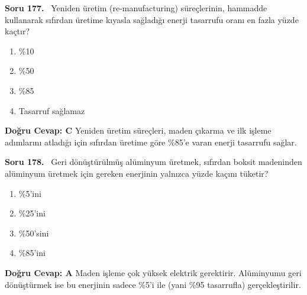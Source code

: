 \documentclass[11pt,a4paper,openany]{book}
\begin{document}
\needspace{5cm}
\vspace{8pt}
\noindent\textbf{\large\sffamily Soru 177.} \ Yeniden üretim (re-manufacturing) süreçlerinin, hammadde kullanarak sıfırdan üretime kıyasla sağladığı enerji tasarrufu oranı en fazla yüzde kaçtır?
\begin{enumerate}[label=\Alph*), leftmargin=25pt, topsep=4pt, itemsep=2pt]
    \item \%10
    \item \%50
    \item \%85
    \item Tasarruf sağlamaz
\end{enumerate}
\vspace{4pt}
\begin{tcolorbox}[title=Cevap ve Açıklama, colback=gray!3!white, colframe=primarycolor!90!black, arc=2mm, fonttitle=\bfseries\sffamily, top=6pt, bottom=6pt]
    \textbf{Doğru Cevap: C}
    \vspace{2pt}
    Yeniden üretim süreçleri, maden çıkarma ve ilk işleme adımlarını atladığı için sıfırdan üretime göre \%85'e varan enerji tasarrufu sağlar.
\end{tcolorbox}
\vspace{10pt}

\needspace{5cm}
\vspace{8pt}
\noindent\textbf{\large\sffamily Soru 178.} \ Geri dönüştürülmüş alüminyum üretmek, sıfırdan boksit madeninden alüminyum üretmek için gereken enerjinin yalnızca yüzde kaçını tüketir?
\begin{enumerate}[label=\Alph*), leftmargin=25pt, topsep=4pt, itemsep=2pt]
    \item \%5'ini
    \item \%25'ini
    \item \%50'sini
    \item \%85'ini
\end{enumerate}
\vspace{4pt}
\begin{tcolorbox}[title=Cevap ve Açıklama, colback=gray!3!white, colframe=primarycolor!90!black, arc=2mm, fonttitle=\bfseries\sffamily, top=6pt, bottom=6pt]
    \textbf{Doğru Cevap: A}
    \vspace{2pt}
    Maden işleme çok yüksek elektrik gerektirir. Alüminyumu geri dönüştürmek ise bu enerjinin sadece \%5'i ile (yani \%95 tasarrufla) gerçekleştirilir.
\end{tcolorbox}
\vspace{10pt}
\end{document}
